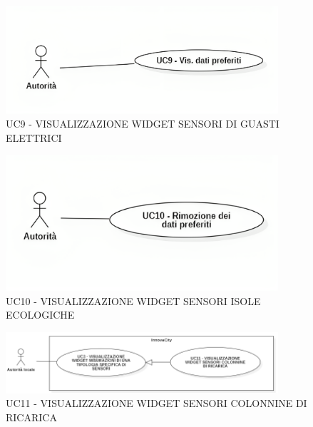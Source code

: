 
\begin{figure}[H]
    \centering
    \includegraphics[width=0.9\textwidth]{../Images/uc9.png}
    \caption{UC9 - VISUALIZZAZIONE WIDGET SENSORI DI GUASTI ELETTRICI}
    \label{fig:UC6_sub}
\end{figure}


\begin{figure}[H]
    \centering
    \includegraphics[width=0.9\textwidth]{../Images/uc10.png}
    \caption{UC10 - VISUALIZZAZIONE WIDGET SENSORI ISOLE ECOLOGICHE}
    \label{fig:UC6_sub}
\end{figure}


\begin{figure}[H]
    \centering
    \includegraphics[width=0.9\textwidth]{../Images/uc11.PNG}
    \caption{UC11 - VISUALIZZAZIONE WIDGET SENSORI COLONNINE DI RICARICA}
    \label{fig:UC6_sub}
\end{figure}

